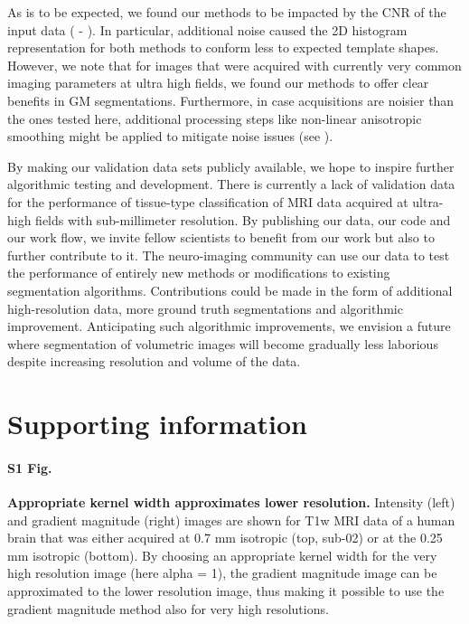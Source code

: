 As is to be expected, we found our methods to be impacted by the CNR of the input data ( - ). In particular, additional noise caused the 2D histogram representation for both methods to conform less to expected template shapes. However, we note that for images that were acquired with currently very common imaging parameters at ultra high fields, we found our methods to offer clear benefits in GM segmentations. Furthermore, in case acquisitions are noisier than the ones tested here, additional processing steps like non-linear anisotropic smoothing \cite{Weickert1998, Mirebeau2015} might be applied to mitigate noise issues (see ).

By making our validation data sets publicly available, we hope to inspire further algorithmic testing and development. There is currently a lack of validation data for the performance of tissue-type classification of MRI data acquired at ultra-high fields with sub-millimeter resolution. By publishing our data, our code and our work flow, we invite fellow scientists to benefit from our work but also to further contribute to it. The neuro-imaging community can use our data to test the performance of entirely new methods or modifications to existing segmentation algorithms. Contributions could be made in the form of additional high-resolution data, more ground truth segmentations and algorithmic improvement. Anticipating such algorithmic improvements, we envision a future where segmentation of volumetric images will become gradually less laborious despite increasing resolution and volume of the data.


\section{Supporting information}

\paragraph{S1 Fig.}
\label{S1_Fig}
{\bf Appropriate kernel width approximates lower resolution.} Intensity (left) and gradient magnitude (right) images are shown for T1w MRI data of a human brain that was either acquired at 0.7 mm isotropic (top, sub-02) or at the 0.25 mm isotropic \cite{Lusebrink2017, 250micron_data} (bottom). By choosing an appropriate kernel width for the very high resolution image (here alpha = 1), the gradient magnitude image can be approximated to the lower resolution image, thus making it possible to use the gradient magnitude method also for very high resolutions.

